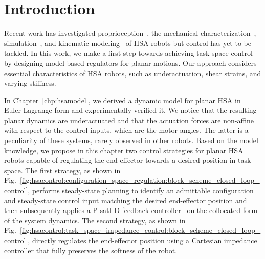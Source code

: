 \section{Introduction}
Recent work has investigated proprioception~\cite{zhang2022vision}, the mechanical characterization~\cite{good2022expanding}, simulation~\cite{stolzle2023modelling}, and kinematic modeling~\cite{garg2022kinematic, stolzle2023modelling} of \gls{HSA} robots but control has yet to be tackled.
In this work, we make a first step towards achieving task-space control by designing model-based regulators for planar motions. Our approach considers essential characteristics of \gls{HSA} robots, such as underactuation, shear strains, and varying stiffness. %

In Chapter~\ref{chp:hsamodel}, we derived a dynamic model for planar \gls{HSA} in Euler-Lagrange form and experimentally verified it.
We notice that the resulting planar dynamics are underactuated and that the actuation forces are non-affine with respect to the control inputs, which are the motor angles. The latter is a peculiarity of these systems, rarely observed in other robots.
Based on the model knowledge, we propose in this chapter two control strategies for planar \gls{HSA} robots capable of regulating the end-effector towards a desired position in task-space.
The first strategy, as shown in Fig.~\ref{fig:hsacontrol:configuration_space_regulation:block_scheme_closed_loop_control}, performs steady-state planning to identify an admittable configuration and steady-state control input matching the desired end-effector position and then subsequently applies a P-satI-D feedback controller~\cite{pustina2022p} on the collocated form~\cite{pustina2024input} of the system dynamics.
The second strategy, as shown in Fig.~\ref{fig:hsacontrol:task_space_impedance_control:block_scheme_closed_loop_control}, directly regulates the end-effector position using a Cartesian impedance controller that fully preserves the softness of the robot.

